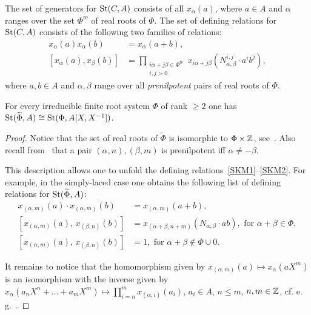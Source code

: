 The set of generators for $\operatorname{St}(C, A)$ consists of all $x_\alpha(a)$, where $a \in A$ and $\alpha$ ranges over the set $\Phi^\mathrm{re}$ of real roots of $\Phi$.
The set of defining relations for $\operatorname{St}(C, A)$ consists of the following two families of relations:
\begin{align}
    x_\alpha(a) x_\alpha(b) & =  x_\alpha(a + b), \label{SKM1} \\
    [x_\alpha(a), x_\beta(b)] & =  \prod \limits_{\substack{i\alpha+j\beta \in \Phi^\mathrm{re} \\ i, j > 0 }} x_{i\alpha+j\beta}(N_{\alpha, \beta}^{i, j} \cdot a^i b^j), \label{SKM2}
\end{align}
where $a, b \in A$ and $\alpha, \beta$ range over all {\it prenilpotent} pairs of real roots of $\Phi$.

\begin{lemma} \label{lem:affine-vs-loop} For every irreducible finite root system $\Phi$ of rank $\geq 2$ one has $\operatorname{St}(\widetilde{\Phi}, A) \cong \operatorname{St}(\Phi, A[X, X^{-1}])$.
\end{lemma}
\begin{proof}
    Notice that the set of real roots of $\widetilde{\Phi}$ is isomorphic to $\Phi \times \mathbb{Z}$, see~\cite[\S~3]{A16}.
    Also recall from~\cite[\S~5]{A16} that a pair $(\alpha, n), (\beta, m)$ is prenilpotent iff $\alpha \neq - \beta$.

    This description allows one to unfold the defining relations~\eqref{SKM1}--\eqref{SKM2}.
    For example, in the simply-laced case one obtains the following list of defining relations for $\operatorname{St}(\widetilde{\Phi}, A)$:
    \begin{align}
        x_{(\alpha, m)}(a)\cdot x_{(\alpha, m)}(b)&=x_{(\alpha, m)}(a+b),  \label{AR1}\\
        [x_{(\alpha, m)}(a),\,x_{(\beta, n)}(b)]  &=x_{(\alpha+\beta, n+m)}(N_{\alpha,\beta} \cdot ab),\text{ for }\alpha+\beta\in\Phi, \label{AR2} \\
        [x_{(\alpha, m)}(a),\,x_{(\beta, n)}(b)]  &=1,\text{ for }\alpha+\beta\not\in\Phi\cup0. \label{AR3}
    \end{align}

    It remains to notice that the homomorphism given by $x_{(\alpha, m)}(a) \mapsto x_\alpha(aX^m)$ is an isomorphism with the inverse given by
    $x_\alpha(a_{n}X^n + \ldots + a_m X^m) \mapsto \prod_{i=n}^m x_{(\alpha, i)}(a_i)$, $a_i \in A$, $n \leq m$, $n, m\in \mathbb{Z}$, cf. e.\,g.~\cite[\S~5.1]{LS20}.
\end{proof}

